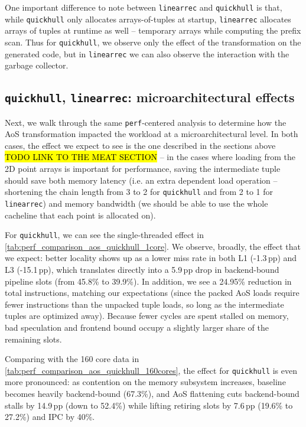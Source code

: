 One important difference to note between \texttt{linearrec} and
\texttt{quickhull} is that, while \texttt{quickhull} only allocates
arrays-of-tuples at startup, \texttt{linearrec} allocates arrays of tuples at
runtime as well -- temporary arrays while computing the prefix scan. Thus for
\texttt{quickhull}, we observe only the effect of the transformation on the
generated code, but in \texttt{linearrec} we can also observe the interaction
with the garbage collector.



\subsection{\texttt{quickhull}, \texttt{linearrec}: microarchitectural effects}
Next, we walk through the same \texttt{perf}-centered analysis to determine how
the AoS transformation impacted the workload at a microarchitectural level. In
both cases, the effect we expect to see is the one described in the sections
above \hl{TODO LINK TO THE MEAT SECTION} -- in the cases where loading from the
2D point arrays is important for performance, saving the intermediate tuple
should save both memory latency (i.e. an extra dependent load operation --
shortening the chain length from 3 to 2 for \texttt{quickhull} and from 2 to 1
for \texttt{linearrec}) and memory bandwidth (we should be able to use the whole
cacheline that each point is allocated on).

For \texttt{quickhull}, we can see the single-threaded effect in
\cref{tab:perf_comparison_aos_quickhull_1core}. We observe, broadly, the effect
that we expect: better locality shows up as a lower miss rate in both L1
(-1.3\,pp) and L3 (-15.1\,pp), which translates directly into a 5.9\,pp drop in
backend-bound pipeline slots (from 45.8\% to 39.9\%). In addition, we see a
24.95\% reduction in total instructions, matching our expectations (since the
packed AoS loads require fewer instructions than the unpacked tuple loads, so
long as the intermediate tuples are optimized away). Because fewer cycles are
spent stalled on memory, bad speculation and frontend bound occupy a slightly
larger share of the remaining slots.

Comparing with the 160 core data in
\cref{tab:perf_comparison_aos_quickhull_160cores}, the effect for \texttt{quickhull}
is even more pronounced: as contention on the memory subsystem increases,
baseline becomes heavily backend-bound (67.3\%), and AoS flattening cuts
backend-bound stalls by 14.9\,pp (down to 52.4\%) while lifting retiring slots
by 7.6\,pp (19.6\% to 27.2\%) and IPC by 40\%.

